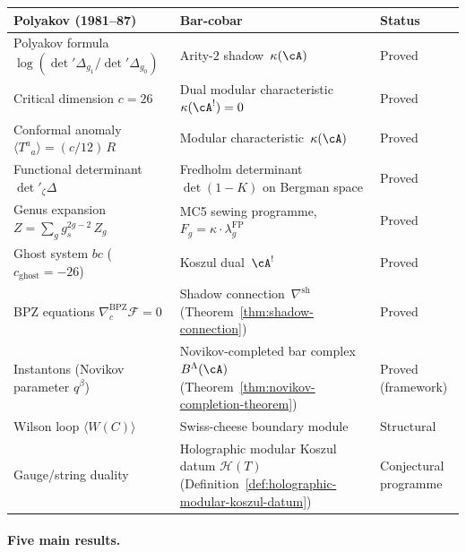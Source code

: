 \begin{center}
\renewcommand{\arraystretch}{1.25}
\begin{tabular}{@{}p{4.8cm}p{5.6cm}l@{}}
\toprule
\textbf{Polyakov (1981--87)} & \textbf{Bar-cobar} & \textbf{Status} \\
\midrule
Polyakov formula
  $\log(\det'\!\Delta_{g_1}/\det'\!\Delta_{g_0})$
  & Arity-$2$ shadow~$\kappa(\cA)$
  & Proved \\
Critical dimension $c = 26$
  & Dual modular characteristic
    $\kappa(\cA^!) = 0$
  & Proved \\
Conformal anomaly
  $\langle T^a{}_a \rangle = (c/12)\,R$
  & Modular characteristic~$\kappa(\cA)$
  & Proved \\
Functional determinant $\det'_\zeta\!\Delta$
  & Fredholm determinant $\det(1 - K)$
    on Bergman space
  & Proved \\
Genus expansion
  $Z = \sum_g g_s^{2g-2}\,Z_g$
  & MC5 sewing programme,
    $F_g = \kappa \cdot \lambda_g^{\mathrm{FP}}$
  & Proved \\
Ghost system $bc$
  ($c_{\mathrm{ghost}} = -26$)
  & Koszul dual~$\cA^!$
  & Proved \\
BPZ equations
  $\nabla^{\mathrm{BPZ}}_c \mathcal{F} = 0$
  & Shadow connection~$\nabla^{\mathrm{sh}}$
    (Theorem~\ref{thm:shadow-connection})
  & Proved \\
Instantons (Novikov parameter $q^\beta$)
  & Novikov-completed bar complex
    $B^\Lambda(\cA)$
    (Theorem~\ref{thm:novikov-completion-theorem})
  & Proved (framework) \\
Wilson loop $\langle W(C) \rangle$
  & Swiss-cheese boundary module
  & Structural \\
Gauge/string duality
  & Holographic modular Koszul datum
    $\mathcal{H}(T)$
    (Definition~\ref{def:holographic-modular-koszul-datum})
  & Conjectural programme \\
\bottomrule
\end{tabular}
\end{center}

\paragraph{Five main results.}

